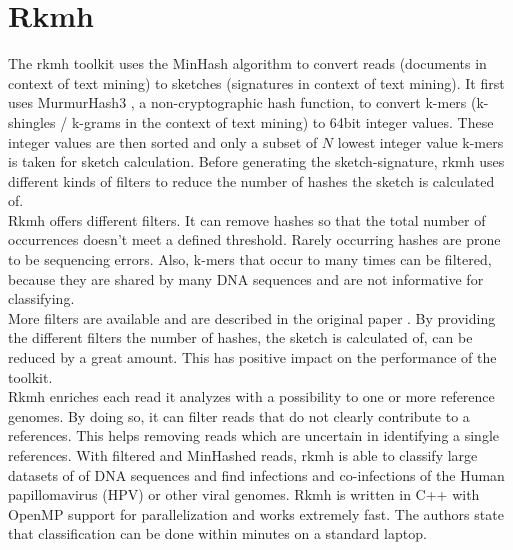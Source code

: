 \section{Rkmh}

The rkmh toolkit uses the MinHash algorithm to convert reads (documents in context of text mining) to sketches (signatures in context of text mining). It first uses MurmurHash3 \cite{murmurHash}, a non-cryptographic hash function, to convert k-mers (k-shingles / k-grams in the context of text mining) to 64bit integer values. These integer values are then sorted and only a subset of $ N $ lowest integer value k-mers is taken for sketch calculation.  Before generating the sketch-signature, rkmh uses different kinds of filters to reduce the number of hashes the sketch is calculated of.\\

Rkmh offers different filters. It can remove hashes so that the total number of occurrences doesn't meet a defined threshold. Rarely occurring hashes are prone to be sequencing errors. Also, k-mers that occur to many times can be filtered, because they are shared by many DNA sequences and are not informative for classifying.\\

More filters are available and are described in the original paper \cite{rkmh}. By providing the different filters the number of hashes, the sketch is calculated of, can be reduced by a great amount. This has positive impact on the performance of the toolkit.\\

Rkmh enriches each read it analyzes with a possibility to one or more reference genomes. By doing so, it can filter reads that do not clearly contribute to a references. This helps removing reads which are uncertain in identifying a single references. With filtered and MinHashed reads, rkmh is able to classify large datasets of of DNA sequences and find infections and co-infections of the Human papillomavirus (HPV) or other viral genomes. Rkmh is written in C++ with OpenMP \cite{openMP} support for parallelization and works extremely fast. The authors state that classification can be done within minutes on a standard laptop.
